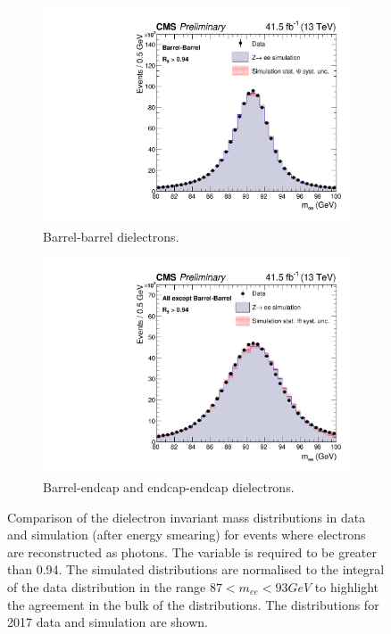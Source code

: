 \begin{figure}[h!]
  \centering
  \begin{subfigure}{0.49\textwidth}
    \includegraphics[width=\textwidth]{Figures/Objects/meeBarrel_2017}
    \caption{Barrel-barrel dielectrons.}
    \label{fig:obj_meeBarrel_2017}
  \end{subfigure}
  \begin{subfigure}{0.49\textwidth}
    \includegraphics[width=\textwidth]{Figures/Objects/meeEndcap_2017}
    \caption{Barrel-endcap and endcap-endcap dielectrons.}
    \label{fig:obj_meeEndcap_2017}
  \end{subfigure}
  \caption{Comparison of the dielectron invariant mass distributions in data and simulation
  (after energy smearing) for \Zee
  events where electrons are reconstructed as photons.
  The \RNINE variable is required to be greater than 0.94.
  The simulated distributions are
  normalised to the integral of the data distribution in the range $87 < m_{ee} < 93 GeV$ to highlight
  the agreement in the bulk of the distributions.
  The distributions for 2017 data and simulation are shown.}
  \label{fig:obj_mee_2017}
\end{figure}

